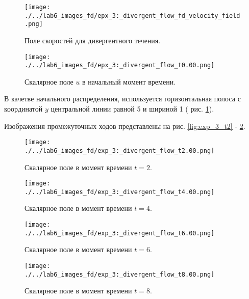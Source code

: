 \begin{figure}
	\centering
	\begin{minipage}[b]{0.48\textwidth}
		\centering
	\texttt{[image: ./../lab6\_images\_fd/epx\_3:\_divergent\_flow\_fd\_velocity\_field.png]}
	\caption{Поле скоростей для дивергентного течения.}
	\label{fig:div_velocity}
	\end{minipage}
	\hfill
	\begin{minipage}[b]{0.48\textwidth}
		\centering
	\texttt{[image: ./../lab6\_images\_fd/epx\_3:\_divergent\_flow\_t0.00.png]}
	\caption{Скалярное поле \(u\) в начальный момент времени.}
	\label{fig:div_begin}
	\end{minipage}
\end{figure}

В качетве начального распределения, используется горизонтальная полоса с координатой $y$ центральной линии равной 5 и шириной 1 ( рис. \ref{fig:div_begin}).

Изображения промежуточных ходов представлены на рис. \ref{fig:exp_3_t2} - \ref{fig:exp_3_t8}.

\begin{figure}
	\centering
	\begin{minipage}[b]{0.48\textwidth}
		\centering
		\texttt{[image: ./../lab6\_images\_fd/exp\_3:\_divergent\_flow\_t2.00.png]}
		\caption{Скалярное поле в момент времени $t=2$.}
		\label{fig:exp_3_t2}
	\end{minipage}
	\hfill
	\begin{minipage}[b]{0.48\textwidth}
		\centering
		\texttt{[image: ./../lab6\_images\_fd/exp\_3:\_divergent\_flow\_t4.00.png]}
		\caption{Скалярное поле в момент времени $t=4$.}
	\end{minipage}
	\vspace{0.5cm}
	
	\begin{minipage}[b]{0.48\textwidth}
		\centering
		\texttt{[image: ./../lab6\_images\_fd/exp\_3:\_divergent\_flow\_t6.00.png]}
		\caption{Скалярное поле в момент времени $t=6$.}
	\end{minipage}
	\hfill
	\begin{minipage}[b]{0.48\textwidth}
		\centering
		\texttt{[image: ./../lab6\_images\_fd/exp\_3:\_divergent\_flow\_t8.00.png]}
		\caption{Скалярное поле в момент времени $t=8$.}
		\label{fig:exp_3_t8}
	\end{minipage}
\end{figure}

